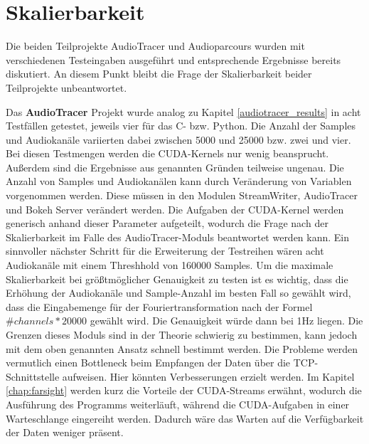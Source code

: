 \section{Skalierbarkeit}

Die beiden Teilprojekte AudioTracer und Audioparcours wurden mit verschiedenen Testeingaben ausgeführt und entsprechende Ergebnisse bereits diskutiert. An diesem Punkt bleibt die Frage der Skalierbarkeit beider Teilprojekte unbeantwortet. 

Das \textbf{AudioTracer} Projekt wurde analog zu Kapitel \ref{audiotracer_results} in acht Testfällen getestet, jeweils vier für das C- bzw. Python. Die Anzahl der Samples und Audiokanäle variierten dabei zwischen 5000 und 25000 bzw. zwei und vier. Bei diesen Testmengen werden die CUDA-Kernels nur wenig beansprucht. Außerdem sind die Ergebnisse aus genannten Gründen teilweise ungenau. Die Anzahl von Samples und Audiokanälen kann durch Veränderung von Variablen vorgenommen werden. Diese müssen in den Modulen StreamWriter, AudioTracer und Bokeh Server verändert werden. Die Aufgaben der CUDA-Kernel werden generisch anhand dieser Parameter aufgeteilt, wodurch die Frage nach der Skalierbarkeit im Falle des AudioTracer-Moduls beantwortet werden kann. Ein sinnvoller nächster Schritt für die Erweiterung der Testreihen wären acht Audiokanäle mit einem Threshhold von 160000 Samples. Um die maximale Skalierbarkeit bei größtmöglicher Genauigkeit zu testen ist es wichtig, dass die Erhöhung der Audiokanäle und Sample-Anzahl im besten Fall so gewählt wird, dass die Eingabemenge für der Fouriertransformation nach der Formel $\#channels * 20000$ gewählt wird. Die Genauigkeit würde dann bei 1Hz liegen. Die Grenzen dieses Moduls sind in der Theorie schwierig zu bestimmen, kann jedoch mit dem oben genannten Ansatz schnell bestimmt werden. Die Probleme werden vermutlich einen Bottleneck beim Empfangen der Daten über die TCP-Schnittstelle aufweisen. Hier könnten Verbesserungen erzielt werden. Im Kapitel \ref{chap:farsight} werden kurz die Vorteile der CUDA-Streams erwähnt, wodurch die Ausführung des Programms weiterläuft, während die CUDA-Aufgaben in einer Warteschlange eingereiht werden. Dadurch wäre das Warten auf die Verfügbarkeit der Daten weniger präsent.

